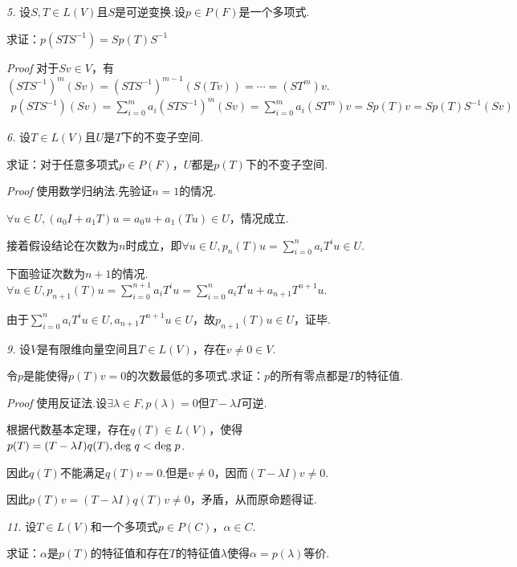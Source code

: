 \textit{5.}
设\(S,T \in L(V)\)且\(S\)是可逆变换.设\(p \in P(F)\)是一个多项式.

求证：\(p(STS^{-1})=Sp(T)S^{-1}\)

\textit{Proof}
对于\(Sv \in V\)，有\((STS^{-1})^m (Sv)=(STS^{-1})^{m-1}(S(Tv))=\cdots=(ST^m)v\).
    \begin{align*}
        p(STS^{-1})(Sv)=\sum_{i=0}^m a_i(STS^{-1})^m (Sv) 
        =\sum_{i=0}^m a_i(ST^m)v=Sp(T)v=Sp(T)S^{-1}(Sv)
    \end{align*}

\newpage

\textit{6.}
设\(T \in L(V)\)且\(U\)是\(T\)下的不变子空间.

求证：对于任意多项式\(p \in P(F)\)，\(U\)都是\(p(T)\)下的不变子空间.

\textit{Proof}
使用数学归纳法.先验证\(n=1\)的情况.

\(\forall u \in U,(a_0I+a_1T)u=a_0u+a_1(Tu) \in U\)，情况成立.

接着假设结论在次数为\(n\)时成立，即\(\forall u \in U,p_n(T)u=\sum_{i=0}^n a_iT^iu \in U\).

下面验证次数为\(n+1\)的情况.
\(\forall u \in U,p_{n+1}(T)u=\sum_{i=0}^{n+1} a_iT^iu=\sum_{i=0}^n a_iT^iu+a_{n+1}T^{n+1}u\).

由于\(\sum_{i=0}^n a_iT^iu \in U,a_{n+1}T^{n+1}u \in U\)，故\(p_{n+1}(T)u \in U\)，证毕.

\hspace*{\fill}

\textit{9.}
设\(V\)是有限维向量空间且\(T \in L(V)\)，存在\(v \ne 0 \in V\).

令\(p\)是能使得\(p(T)v=0\)的次数最低的多项式.求证：\(p\)的所有零点都是\(T\)的特征值.

\textit{Proof}
使用反证法.设\(\exists \lambda \in F,p(\lambda)=0\)但\(T-\lambda I\)可逆.

根据代数基本定理，存在\(q(T) \in L(V)\)，使得\(p(T)=(T-\lambda I)q(T),\mathrm{deg \;} q<\mathrm{deg \;} p\).

因此\(q(T)\)不能满足\(q(T)v=0\).但是\(v \ne 0\)，因而\((T-\lambda I)v \ne 0\).

因此\(p(T)v=(T-\lambda I)q(T)v \ne 0\)，矛盾，从而原命题得证.

\hspace*{\fill}

\textit{11.}
设\(T \in L(V)\)和一个多项式\(p \in P(C)\)，\(\alpha \in C\).

求证：\(\alpha\)是\(p(T)\)的特征值和存在\(T\)的特征值\(\lambda\)使得\(\alpha=p(\lambda)\)等价.

